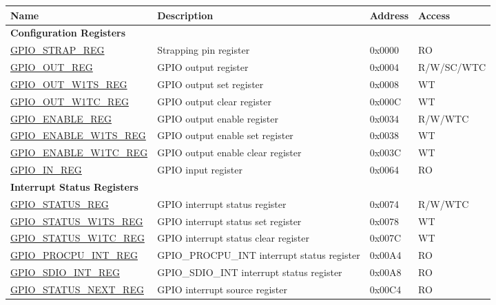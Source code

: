 \begin{longtable}{ | p{5.5cm} | p{6.2cm} | p{1.3cm} | p{2cm} | }
\hline\rowcolor{lightgray}
\textbf{Name} & \textbf{Description} &  \textbf{Address} & \textbf{Access} \\ \hline
\endhead
\multicolumn{4}{|l|}{\textbf{Configuration Registers}} \\ \hline
\hyperref[regdesc:GPIOSTRAPREG]{GPIO\_STRAP\_REG} & Strapping pin register & 0x0000 & RO \\ \hline
\hyperref[regdesc:GPIOOUTREG]{GPIO\_OUT\_REG} & GPIO output register & 0x0004 & R/W/SC/WTC \\ \hline
\hyperref[regdesc:GPIOOUTW1TSREG]{GPIO\_OUT\_W1TS\_REG} & GPIO output set register & 0x0008 & WT \\ \hline
\hyperref[regdesc:GPIOOUTW1TCREG]{GPIO\_OUT\_W1TC\_REG} & GPIO output clear register & 0x000C & WT \\ \hline
\hyperref[regdesc:GPIOENABLEREG]{GPIO\_ENABLE\_REG} & GPIO output enable register & 0x0034 & R/W/WTC \\ \hline
\hyperref[regdesc:GPIOENABLEW1TSREG]{GPIO\_ENABLE\_W1TS\_REG} & GPIO output enable set register & 0x0038 & WT \\ \hline
\hyperref[regdesc:GPIOENABLEW1TCREG]{GPIO\_ENABLE\_W1TC\_REG} & GPIO output enable clear register & 0x003C & WT \\ \hline
\hyperref[regdesc:GPIOINREG]{GPIO\_IN\_REG} & GPIO input register & 0x0064 & RO \\ \hline
\multicolumn{4}{|l|}{\textbf{Interrupt Status Registers}} \\ \hline
\hyperref[regdesc:GPIOSTATUSREG]{GPIO\_STATUS\_REG} & GPIO interrupt status register & 0x0074 & R/W/WTC \\ \hline
\hyperref[regdesc:GPIOSTATUSW1TSREG]{GPIO\_STATUS\_W1TS\_REG} & GPIO interrupt status set register & 0x0078 & WT \\ \hline
\hyperref[regdesc:GPIOSTATUSW1TCREG]{GPIO\_STATUS\_W1TC\_REG} & GPIO interrupt status clear register & 0x007C & WT \\ \hline
\hyperref[regdesc:GPIOPROCPUINTREG]{GPIO\_PROCPU\_INT\_REG} & GPIO\_PROCPU\_INT interrupt status register & 0x00A4 & RO \\ \hline
\hyperref[regdesc:GPIOSDIOINTREG]{GPIO\_SDIO\_INT\_REG} & GPIO\_SDIO\_INT interrupt status register & 0x00A8 & RO \\ \hline
\hyperref[regdesc:GPIOSTATUSNEXTREG]{GPIO\_STATUS\_NEXT\_REG} & GPIO interrupt source register & 0x00C4 & RO \\ \hline

\end{longtable}
